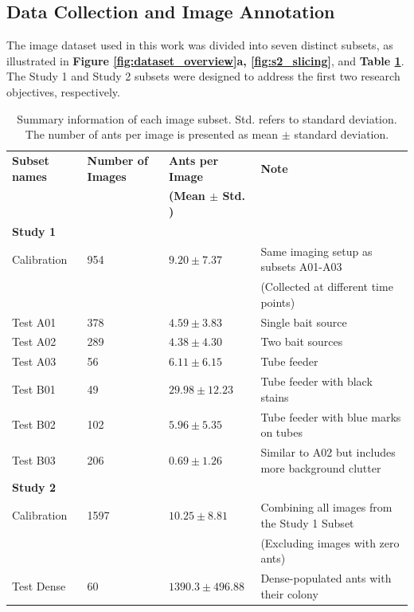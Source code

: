 \subsection{Data Collection and Image Annotation}

The image dataset used in this work was divided into seven distinct subsets, as illustrated in \textbf{Figure \ref{fig:dataset_overview}a, \ref{fig:s2_slicing}}, and \textbf{Table \ref{tab:dataset_overview}}. The Study 1 and Study 2 subsets were designed to address the first two research objectives, respectively.

\begin{table}[H]
    \centering
    \caption{Summary information of each image subset. Std. refers to standard deviation. The number of ants per image is presented as mean $\pm$ standard deviation.}
    \label{tab:dataset_overview}
    \small %
    \begin{tabular}{llll}
        \toprule
        \textbf{Subset names} & \textbf{Number of Images} & \textbf{Ants per Image} & \textbf{Note} \\
        & & \textbf{(Mean $\pm$ Std. )} & \\
        \midrule
        \textbf{Study 1} & & & \\
        \midrule
        Calibration & 954 & $9.20 \pm 7.37$ & Same imaging setup as subsets A01-A03\\ & & & (Collected at different time points)\\
        Test A01 & 378 & $4.59 \pm 3.83$ & Single bait source \\
        Test A02 & 289 & $4.38 \pm 4.30$ & Two bait sources \\
        Test A03 & 56 & $6.11 \pm 6.15$ & Tube feeder \\
        Test B01 & 49 & $29.98 \pm 12.23$ & Tube feeder with black stains \\
        Test B02 & 102 & $5.96 \pm 5.35$ & Tube feeder with blue marks on tubes\\
        Test B03 & 206 & $0.69 \pm 1.26$ & Similar to A02 but includes more background clutter \\
        \midrule
        \textbf{Study 2} & & & \\
        \midrule
        Calibration & 1597 & $10.25 \pm 8.81$ & Combining all images from the Study 1 Subset\\
        &&& (Excluding images with zero ants)\\
        Test Dense & 60 & $1390.3 \pm 496.88$ & Dense-populated ants with their colony\\
        \bottomrule
    \end{tabular}
\end{table}

